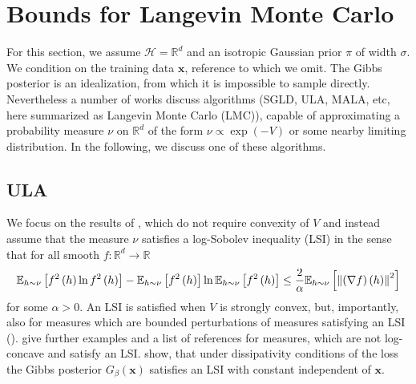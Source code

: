 \documentclass{article} %
\begin{document}
\section{Bounds for Langevin Monte Carlo\label{Langevin Theory}}

For this section, we assume $\mathcal{H}=\mathbb{R}^{d}$ and an isotropic Gaussian prior $\pi$ of width $\sigma$. We condition on the
training data $\mathbf{x}$, reference to which we omit. The Gibbs posterior
is an idealization, from which it is impossible to sample directly.
Nevertheless a number of works \citep{raginsky2017non,
dalalyan2017user,brosse2018promises,vempala2019rapid,dwivedi2019log,nemeth2021stochastic,balasubramanian2022towards} discuss algorithms (SGLD, ULA, MALA, etc, here
summarized as Langevin Monte Carlo (LMC)), capable of approximating a
probability measure $\nu$ on $\mathbb{R}^{d}$ of the form $\nu \propto \exp
\left( -V\right) $ or some nearby limiting distribution. In the following, we discuss one of these algorithms. 
\subsection{ULA\label{Section ULA}}
We focus on the results of \cite{vempala2019rapid}, which do not
require convexity of $V$ and instead assume that the measure $\nu $
satisfies a log-Sobolev inequality (LSI) in the sense that for all smooth $f:%
\mathbb{R}^{d}\rightarrow \mathbb{R}$%
\begin{equation}
\mathbb{E}_{h\sim \nu }\left[ f^{2}\left( h\right) \ln f^{2}\left( h\right) %
\right] -\mathbb{E}_{h\sim \nu }\left[ f^{2}\left( h\right) \right] \ln 
\mathbb{E}_{h\sim \nu }\left[ f^{2}\left( h\right) \right] \leq \frac{2}{%
\alpha }\mathbb{E}_{h\sim \nu }\left[ \left\Vert \left( \nabla f\right)
\left( h\right) \right\Vert ^{2}\right]  \label{log sobolev}
\end{equation}%
for some $\alpha >0$. An LSI is satisfied when $V$ is strongly convex, but,
importantly, also for measures which are bounded perturbations of measures
satisfying an LSI (\cite{holley1986logarithmic}). \cite{vempala2019rapid}
give further examples and a list of references for measures, which are not
log-concave and satisfy an LSI. \cite{raginsky2017non} show, that
under dissipativity conditions of the loss the Gibbs posterior $G_{\beta
}\left( \mathbf{x}\right) $ satisfies an LSI with constant independent of $%
\mathbf{x}$.
\end{document}
